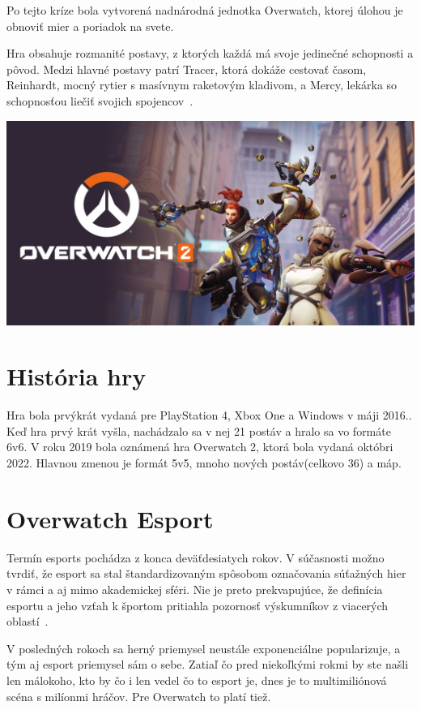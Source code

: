 \documentclass[10pt,oneside,slovak,a4paper]{article}
\begin{document}
Po tejto kríze bola vytvorená nadnárodná jednotka Overwatch, ktorej úlohou je obnoviť mier a poriadok na svete.

Hra obsahuje rozmanité postavy, z ktorých každá má svoje jedinečné schopnosti a pôvod. Medzi hlavné postavy patrí Tracer, ktorá dokáže cestovať časom, Reinhardt, mocný rytier s masívnym raketovým kladivom, a Mercy, lekárka so schopnosťou liečiť svojich spojencov~\cite{Overwatchanalysis}. 

\includegraphics[scale=0.2]{images/overwatch_title_image.jpg}


\section{História hry} \label{História hry}

Hra bola prvýkrát vydaná pre PlayStation 4, Xbox One a Windows v máji 2016.. Keď hra prvý krát vyšla, nachádzalo sa v nej 21 postáv a hralo sa vo formáte 6v6. V roku 2019 bola oznámená hra Overwatch 2, ktorá bola vydaná októbri 2022. Hlavnou zmenou je formát 5v5, mnoho nových postáv(celkovo 36) a máp.


\section{Overwatch Esport} \label{Overwatch Esport}

Termín esports pochádza z konca deväťdesiatych rokov. V súčasnosti možno tvrdiť, že esport sa stal štandardizovaným spôsobom označovania súťažných hier v rámci a aj mimo akademickej sféri. Nie je preto prekvapujúce, že definícia esportu a jeho vzťah k športom pritiahla pozornosť výskumníkov z viacerých oblastí~\cite{Overwatchesport}.

V posledných rokoch sa herný priemysel neustále exponenciálne popularizuje, a tým aj esport priemysel sám o sebe. Zatiaľ čo pred niekoľkými rokmi by ste 
našli len málokoho, kto by čo i len vedel čo to esport je, dnes je to multimiliónová scéna s milíonmi hráčov. Pre Overwatch to platí tiež.
\end{document}
